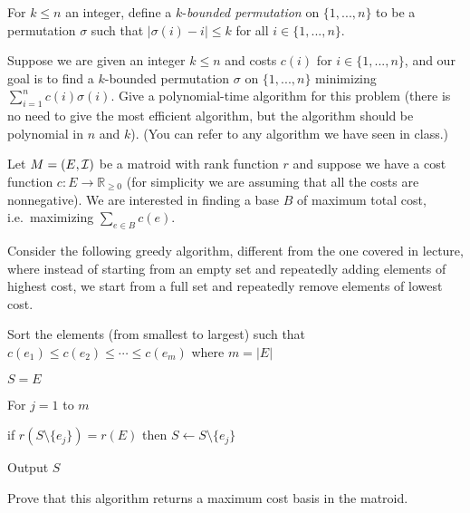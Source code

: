 \documentclass[12pt]{article}
\begin{document}
\begin{enumerate}
\item


For $k \le n$ an integer, define a $k$-\emph{bounded permutation} on $\{1, ..., n\}$ to be a permutation $\sigma$ such that $|\sigma(i) - i| \le k$ for all $i \in \{1, ..., n\}$.

Suppose we are given an integer $k \le n$ and costs $c(i)$ for $i\in\{1,...,n\}$, and our goal is to find a $k$-bounded permutation $\sigma$ on $\{1, ..., n\}$ minimizing $\sum_{i=1}^n c(i) \sigma(i)$. Give a polynomial-time  algorithm for this problem (there is no need to give the most efficient algorithm, but the algorithm should be polynomial in $n$ and $k$). (You can refer to any algorithm we have seen in class.)  

\bigskip

\item


Let $M=(E,{\cal I})$ be a matroid with rank function $r$ and suppose we have a cost function $c: E \rightarrow {\mathbb R}_{\geq 0}$ (for simplicity we are assuming that all the costs are nonnegative). We are interested in finding a base $B$ of maximum total cost, i.e.~maximizing $\sum_{e \in B} c(e)$.%

Consider the following greedy algorithm, different from the one covered in lecture, where instead of starting from an empty set and repeatedly adding elements of highest cost, we start from a full set and repeatedly remove elements of lowest cost.
\begin{pseudocode}
\item Sort the elements (from smallest to largest) such that $c(e_1)\leq
  c(e_2)\leq \cdots \leq c(e_{m})$ where $m=|E|$
\item $S=E$
\item For $j=1$ to $m$
\begin{pseudocode}
\item
 if $r(S \setminus \{e_j\})=r(E)$ then $S\leftarrow S\setminus \{e_j\}$
 \end{pseudocode}
 \item Output $S$
 \end{pseudocode}
Prove that this algorithm returns a maximum cost basis in the matroid. 



\end{enumerate}
\end{document}
